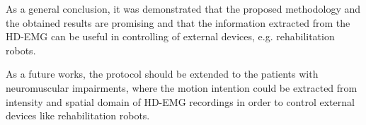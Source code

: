 As a general conclusion, it was demonstrated that the proposed methodology and the obtained results are promising and that the information extracted from the HD-EMG can be useful in controlling of external devices, e.g. rehabilitation robots.

As a future works, the protocol should be extended to the patients with neuromuscular impairments, where the motion intention could be extracted from intensity and spatial domain of HD-EMG recordings in order to control external devices like rehabilitation robots. 

 

